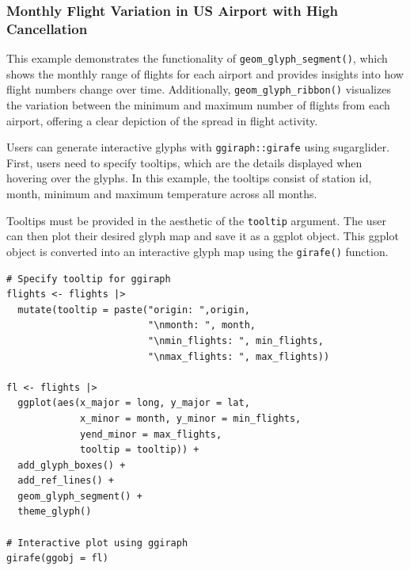 \hypertarget{monthly-flight-variation-in-us-airport-with-high-cancellation}{%
\subsubsection{Monthly Flight Variation in US Airport with High Cancellation}\label{monthly-flight-variation-in-us-airport-with-high-cancellation}}

This example demonstrates the functionality of \texttt{geom\_glyph\_segment()}, which shows the monthly range of flights for each airport and provides insights into how flight numbers change over time. Additionally, \texttt{geom\_glyph\_ribbon()} visualizes the variation between the minimum and maximum number of flights from each airport, offering a clear depiction of the spread in flight activity.

Users can generate interactive glyphs with \texttt{ggiraph::girafe} using sugarglider. First, users need to specify tooltips, which are the details displayed when hovering over the glyphs. In this example, the tooltips consist of station id, month, minimum and maximum temperature across all months.

Tooltips must be provided in the aesthetic of the \texttt{tooltip} argument. The user can then plot their desired glyph map and save it as a ggplot object. This ggplot object is converted into an interactive glyph map using the \texttt{girafe()} function.

\begin{verbatim}
# Specify tooltip for ggiraph 
flights <- flights |>
  mutate(tooltip = paste("origin: ",origin,
                         "\nmonth: ", month,
                         "\nmin_flights: ", min_flights,
                         "\nmax_flights: ", max_flights))

fl <- flights |> 
  ggplot(aes(x_major = long, y_major = lat,
             x_minor = month, y_minor = min_flights,
             yend_minor = max_flights,
             tooltip = tooltip)) + 
  add_glyph_boxes() +
  add_ref_lines() +
  geom_glyph_segment() +
  theme_glyph()

# Interactive plot using ggiraph
girafe(ggobj = fl)
\end{verbatim}

